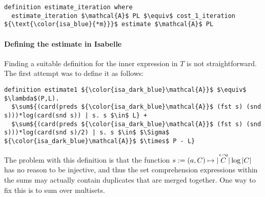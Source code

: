\documentclass[12pt, a4 paper]{article}
\theoremstyle{definition}
\begin{document}
\begin{lstlisting}[language=Isabelle]
definition estimate_iteration where
  estimate_iteration $\mathcal{A}$ PL $\equiv$ cost_1_iteration ${\text{\color{isa_blue}{*m}}}$ estimate $\mathcal{A}$ PL
\end{lstlisting}

\paragraph{Defining the estimate in Isabelle} Finding a suitable definition for the inner expression in $T$ is not straightforward. The first attempt was to define it as follows:

\begin{lstlisting}[language=Isabelle]
definition estimate1 ${\color{isa_dark_blue}\mathcal{A}}$ $\equiv$ $\lambda$(P,L).
  $\sum${(card(preds ${\color{isa_dark_blue}\mathcal{A}}$ (fst s) (snd s)))*log(card(snd s)) | s. s $\in$ L} +
  $\sum${(card(preds ${\color{isa_dark_blue}\mathcal{A}}$ (fst s) (snd s)))*log(card(snd s)/2) | s. s $\in$ $\Sigma$ ${\color{isa_dark_blue}\mathcal{A}}$ $\times$ P - L}
\end{lstlisting}

The problem with this definition is that the function $s := (a, C) \mapsto |\overset{\hookleftarrow {a}}{C}| \log |C|$ has no reason to be injective, and thus the set comprehension expressions within the sums may actually contain duplicates that are merged together. One way to fix this is to sum over multisets.





% 

\pagebreak


\end{document}
